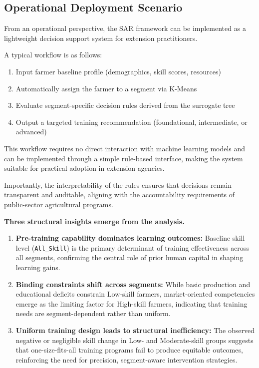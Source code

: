 \documentclass[3p,twocolumn,authoryear]{elsarticle}
\begin{document}
\subsection{Operational Deployment Scenario}

From an operational perspective, the SAR framework can be implemented as
a lightweight decision support system for extension practitioners.

A typical workflow is as follows:
\begin{enumerate}
  \item Input farmer baseline profile (demographics, skill scores, resources)
  \item Automatically assign the farmer to a segment via K-Means
  \item Evaluate segment-specific decision rules derived from the surrogate tree
  \item Output a targeted training recommendation (foundational, intermediate, or advanced)
\end{enumerate}

This workflow requires no direct interaction with machine learning models
and can be implemented through a simple rule-based interface,
making the system suitable for practical adoption in extension agencies.

Importantly, the interpretability of the rules ensures that decisions
remain transparent and auditable, aligning with the accountability
requirements of public-sector agricultural programs.

\noindent\textbf{Three structural insights emerge from the analysis.}

\begin{enumerate}
  \item \textbf{Pre-training capability dominates learning outcomes:}
  Baseline skill level (\texttt{All\_Skill}) is the primary determinant
  of training effectiveness across all segments, confirming the central
  role of prior human capital in shaping learning gains.

  \item \textbf{Binding constraints shift across segments:}
  While basic production and educational deficits constrain
  Low-skill farmers, market-oriented competencies emerge as the
  limiting factor for High-skill farmers, indicating that training
  needs are segment-dependent rather than uniform.

  \item \textbf{Uniform training design leads to structural inefficiency:}
  The observed negative or negligible skill change in Low- and
  Moderate-skill groups suggests that one-size-fits-all training
  programs fail to produce equitable outcomes, reinforcing the need
  for precision, segment-aware intervention strategies.
\end{enumerate}
\end{document}
